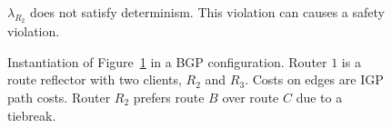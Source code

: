 \begin{figure}
\centering
\begin{psfrags}
%
\hspace{-0.4in}
\end{psfrags}
\caption[How determinism violations can cause safety
  violations.]{$\lambda_{R_2}$ does not satisfy determinism.  This violation
  can causes a safety violation.}
\label{fig:determinism}
\end{figure}


\begin{figure}
\centering
\begin{psfrags}
%
\hspace{-1.5in}
\end{psfrags}
\caption[Instantiation of Figure~\ref{fig:determinism} in a BGP
  configuration.]{Instantiation of Figure~\ref{fig:determinism} in a BGP
  configuration.  Router $1$ is a route reflector with two clients, $R_2$
  and $R_3$.  Costs on edges are IGP path costs.  Router $R_2$ prefers route
  $B$ over route $C$ due to a tiebreak.}
\label{fig:determinism_bgp}
\end{figure}


